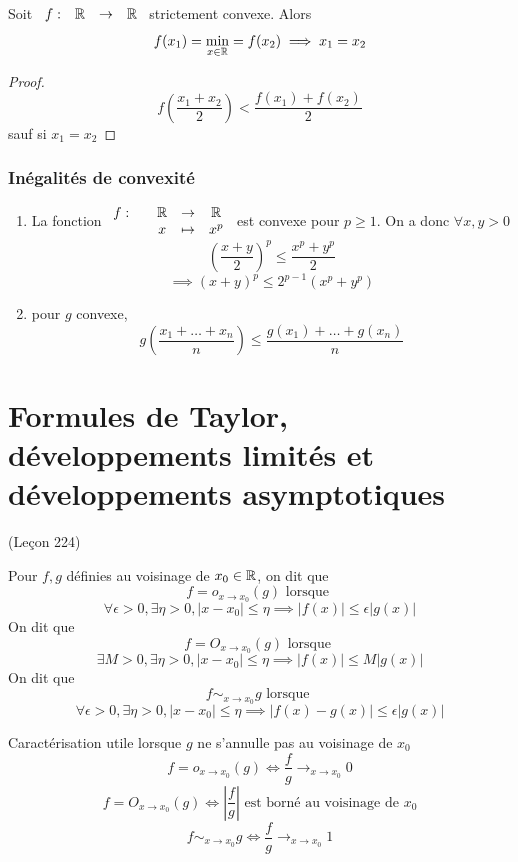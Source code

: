 \documentclass[]{report}
\begin{document}
\begin{prop}{}{}
    Soit $\begin{array}{ccccc} f : & \mathbb{R} & \to & \mathbb{R} \end{array}$ strictement convexe. Alors
    \[f(x_1)=\min_{x\in \mathbb{R}}=f(x_2)\implies x_1=x_2\]
\end{prop}

\begin{proof}
    \[f\left(\frac{x_1+x_2}{2}\right)<\frac{f(x_1)+f(x_2)}{2}\]
    sauf si $x_1=x_2$
\end{proof}

\subsection*{Inégalités de convexité}
\begin{enumerate}
    \item La fonction $\begin{array}{ccccc} f : & & \mathbb{R} & \to & \mathbb{R} \\ & & x & \mapsto & x^p \end{array}$ est convexe pour $p \ge 1$. On a donc $\forall x,y>0$
          \[\left(\frac{x+y}{2}\right)^p\le \frac{x^p+y^p}{2}\]
          \[\implies \left(x+y\right)^p\le 2^{p-1} \left(x^p+y^p\right)\]
    \item pour $g$ convexe,
          \[ g\left(\frac{x_1+\ldots+x_n}{n}\right)\le \frac{g(x_1)+\ldots+g(x_n)}{n}\]
\end{enumerate}

\chapter{Formules de Taylor, développements limités et développements asymptotiques}
(Leçon 224)

Pour $f,g$ définies au voisinage de $x_0\in \mathbb{R}$, on dit que
\[f= o_{x\to x_0} (g)\text{ lorsque }\]
\[\forall \epsilon>0,\exists \eta>0, \left|x-x_0\right|\le \eta \implies \left|f(x)\right| \le \epsilon \left|g(x)\right|\]
On dit que
\[f= O_{x\to x_0} (g)\text{ lorsque }\]
\[\exists M>0,\exists \eta>0, \left|x-x_0\right|\le \eta \implies \left|f(x)\right| \le M \left|g(x)\right|\]
On dit que
\[f \sim_{x\to x_0} g\text{ lorsque }\]
\[\forall \epsilon>0,\exists \eta>0, \left|x-x_0\right|\le \eta \implies \left|f(x)-g(x)\right| \le \epsilon \left|g(x)\right|\]

\begin{prop}{Caractérisation utile lorsque $g$ ne s'annulle pas au voisinage de $x_0$}{}
    \[f= o_{x\to x_0} (g) \iff \frac{f}{g}\longrightarrow_{x\to x_0}0\]
    \[f= O_{x\to x_0} (g)\iff \left|\frac{f}{g}\right|\text{ est borné au voisinage de $x_0$} \]
    \[f \sim_{x\to x_0} g \iff \frac{f}{g}\longrightarrow_{x\to x_0}1\]
\end{prop}
\end{document}
